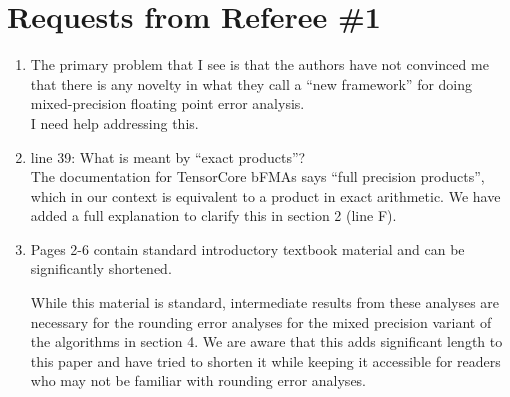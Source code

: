 \documentclass[10pt]{article}
\begin{document}
\section*{Requests from Referee \#1}
\begin{enumerate}\bfseries
	\item The primary problem that I see is that the authors have not convinced me that there is any novelty in what they call a ``new framework'' for doing mixed-precision floating point error analysis.\\
	{\normalfont I need help addressing this.}
	\item line 39: What is meant by ``exact products''? \\
	{\normalfont 
	The documentation for TensorCore bFMAs says ``full precision products'', which in our context is equivalent to a product in exact arithmetic.
	We have added a full explanation to clarify this in section 2 (line F). 
	}
	\item Pages 2-6 contain standard introductory textbook material and can be significantly shortened. \\
	{\normalfont
	While this material is standard, intermediate results from these analyses are necessary for the rounding error analyses for the mixed precision variant of the algorithms in section 4.
	We are aware that this adds significant length to this paper and have tried to shorten it while keeping it accessible for readers who may not be familiar with rounding error analyses.
	
	}
\end{enumerate}
\end{document}
